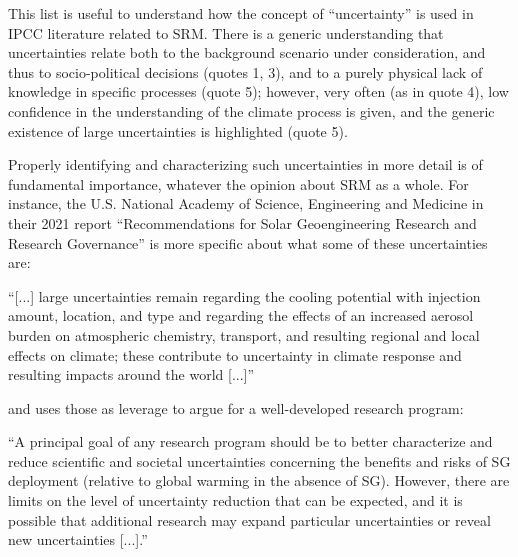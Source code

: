 \documentclass[draft]{agujournal2019}
\begin{document}
This list is useful to understand how the concept of ``uncertainty'' is used in IPCC literature related to SRM. There is a generic understanding that uncertainties relate both to the background scenario under consideration, and thus to socio-political decisions (quotes 1, 3), and to a purely physical lack of knowledge in specific processes (quote 5); however, very often (as in quote 4), low confidence in the understanding of the climate process is given, and the generic existence of large uncertainties is highlighted (quote 5).

Properly identifying and characterizing such uncertainties in more detail is of fundamental importance, whatever the opinion about SRM as a whole. For instance, the U.S. National Academy of Science, Engineering and Medicine in their 2021 report ``Recommendations for Solar Geoengineering Research and Research Governance'' \cite{NASEM2021} is more specific about what some of these uncertainties are:

``[...] large uncertainties remain regarding the cooling potential with injection amount, location, and type and regarding the effects of an increased aerosol burden on atmospheric chemistry, transport, and resulting regional and local effects on climate; these contribute to uncertainty in climate response and resulting impacts around the world [...]''

and uses those as leverage to argue for a well-developed research program:

``A principal goal of any research program should be to better characterize and reduce scientific and societal uncertainties concerning the benefits and risks of SG deployment (relative to global warming in the absence of SG). However, there are limits on the level of uncertainty reduction that can be expected, and it is possible that additional research may expand particular uncertainties or reveal new uncertainties [...].''


\end{document}
